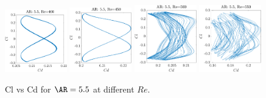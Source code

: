 \begin{figure}
  \centering
  \includegraphics[width=0.24\textwidth]{./fig/nnl/ClCdAR5.5RE400.png}
  \includegraphics[width=0.24\textwidth]{./fig/nnl/ClCdAR5.5RE450.png}
  \includegraphics[width=0.24\textwidth]{./fig/nnl/ClCdAR5.5RE500.png}
  \includegraphics[width=0.24\textwidth]{./fig/nnl/ClCdAR5.5RE550.png}
  \caption{Cl vs Cd for $\AR=5.5$ at different $Re$.}
  \label{fig:ClCd}
\end{figure}

